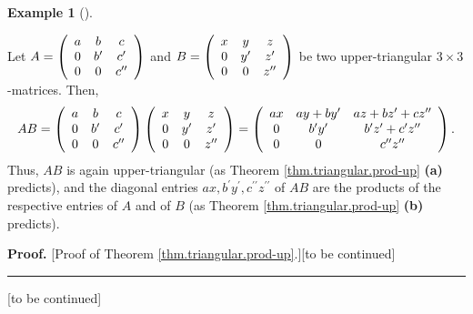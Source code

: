 \documentclass[numbers=enddot,12pt,final,onecolumn,notitlepage]{scrartcl}%
\theoremstyle{definition}
\newtheorem{exam}[theo]{Example}
\newenvironment{example}[1][]
{\begin{exam}[#1]\begin{leftbar}}
{\end{leftbar}\end{exam}}
\newenvironment{proof}[1][Proof]{\noindent\textbf{#1.} }{\ \rule{0.5em}{0.5em}}
\begin{document}
\begin{example}
Let $A=\left(
\begin{array}
[c]{ccc}%
a & b & c\\
0 & b^{\prime} & c^{\prime}\\
0 & 0 & c^{\prime\prime}%
\end{array}
\right)  $ and $B=\left(
\begin{array}
[c]{ccc}%
x & y & z\\
0 & y^{\prime} & z^{\prime}\\
0 & 0 & z^{\prime\prime}%
\end{array}
\right)  $ be two upper-triangular $3\times3$-matrices. Then,%
\[
AB=\left(
\begin{array}
[c]{ccc}%
a & b & c\\
0 & b^{\prime} & c^{\prime}\\
0 & 0 & c^{\prime\prime}%
\end{array}
\right)  \left(
\begin{array}
[c]{ccc}%
x & y & z\\
0 & y^{\prime} & z^{\prime}\\
0 & 0 & z^{\prime\prime}%
\end{array}
\right)  =\left(
\begin{array}
[c]{ccc}%
ax & ay+by^{\prime} & az+bz^{\prime}+cz^{\prime\prime}\\
0 & b^{\prime}y^{\prime} & b^{\prime}z^{\prime}+c^{\prime}z^{\prime\prime}\\
0 & 0 & c^{\prime\prime}z^{\prime\prime}%
\end{array}
\right)  .
\]
Thus, $AB$ is again upper-triangular (as Theorem \ref{thm.triangular.prod-up}
\textbf{(a)} predicts), and the diagonal entries $ax,b^{\prime}y^{\prime
},c^{\prime\prime}z^{\prime\prime}$ of $AB$ are the products of the respective
entries of $A$ and of $B$ (as Theorem \ref{thm.triangular.prod-up}
\textbf{(b)} predicts).
\end{example}

\begin{proof}
[Proof of Theorem \ref{thm.triangular.prod-up}.][to be continued]
\end{proof}

[to be continued]
\end{document}

